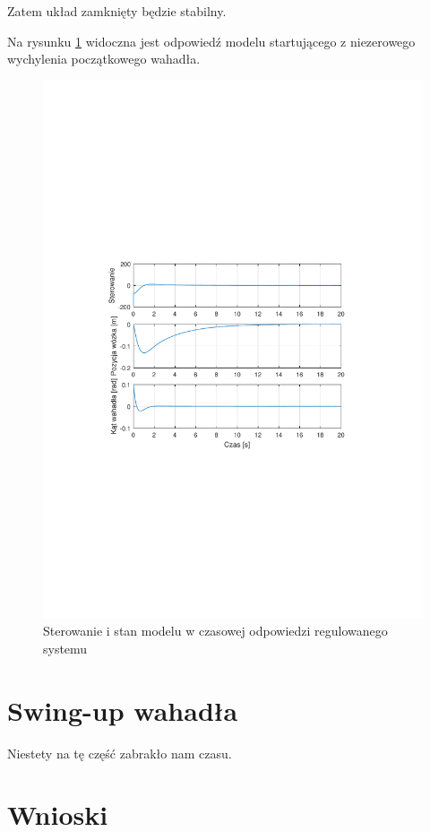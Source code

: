 \documentclass[12pt]{article}
\begin{document}
Zatem układ zamknięty będzie stabilny.

\newpage

Na rysunku \ref{rys:lq_response_model} widoczna jest odpowiedź modelu
startującego z niezerowego wychylenia początkowego wahadła.

\begin{figure}[!htb]
    \begin{center}
        \includegraphics[width=16cm,trim=3cm 9cm 3cm 9cm,clip]
        {../res/img/lq_response_model.pdf}
    \end{center}
    \caption{Sterowanie i stan modelu w czasowej odpowiedzi regulowanego
    systemu}
    \label{rys:lq_response_model}
\end{figure}

\newpage

\section{Swing-up wahadła}

Niestety na tę część zabrakło nam czasu.

\newpage

\section{Wnioski}
\end{document}
